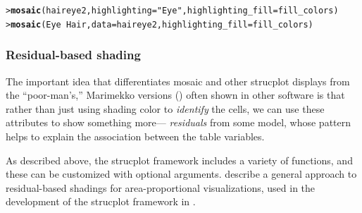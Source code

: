 \documentclass[10pt,krantz2]{krantz}\usepackage[]{graphicx}\usepackage[]{color}
\makeatletter
\newcommand{\hlstr}[1]{\textcolor[rgb]{0.192,0.494,0.8}{#1}}%
\newcommand{\hlopt}[1]{\textcolor[rgb]{0,0,0}{#1}}%
\newcommand{\hlstd}[1]{\textcolor[rgb]{0.345,0.345,0.345}{#1}}%
\newcommand{\hlkwc}[1]{\textcolor[rgb]{0.333,0.667,0.333}{#1}}%
\newcommand{\hlkwd}[1]{\textcolor[rgb]{0.737,0.353,0.396}{\textbf{#1}}}%
\newenvironment{kframe}{%
 \def\at@end@of@kframe{}%
 \ifinner\ifhmode%
  \def\at@end@of@kframe{\end{minipage}}%
  \begin{minipage}{\columnwidth}%
 \fi\fi%
 \def\FrameCommand##1{\hskip\@totalleftmargin \hskip-\fboxsep
 \colorbox{shadecolor}{##1}\hskip-\fboxsep
     \hskip-\linewidth \hskip-\@totalleftmargin \hskip\columnwidth}%
 \MakeFramed {\advance\hsize-\width
   \@totalleftmargin\z@ \linewidth\hsize
   \@setminipage}}%
 {\par\unskip\endMakeFramed%
 \at@end@of@kframe}
\newenvironment{knitrout}{}{} %
\renewenvironment{knitrout}{\small\renewcommand{\baselinestretch}{.85}}{} %
\makeatother
\begin{document}
\begin{knitrout}
\color{fgcolor}\begin{kframe}
\begin{alltt}
\hlstd{> }\hlkwd{mosaic}\hlstd{(haireye2,} \hlkwc{highlighting} \hlstd{=} \hlstr{"Eye"}\hlstd{,} \hlkwc{highlighting_fill} \hlstd{= fill_colors)}
\hlstd{> }\hlkwd{mosaic}\hlstd{(Eye} \hlopt{~} \hlstd{Hair,} \hlkwc{data} \hlstd{= haireye2,} \hlkwc{highlighting_fill} \hlstd{= fill_colors)}
\end{alltt}
\end{kframe}
\end{knitrout}


\subsubsection{Residual-based shading}
The important idea that differentiates mosaic and other strucplot displays from the
``poor-man's,'' Marimekko versions ()
often shown in other software is that rather than
just using shading color to \emph{identify} the cells, we can use these attributes to
show something more--- \emph{residuals} from some model, whose pattern helps to explain
the association between the table variables.

As described above, the strucplot framework includes a variety of  functions,
and these can be customized with optional arguments.
\citet{Zeileis-etal:2007} describe a general approach to residual-based shadings for area-proportional
visualizations, used in the development of the strucplot framework in .
\end{document}
